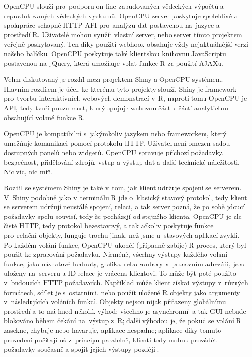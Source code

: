 \documentclass[thesis=B,czech]{FITthesis}[2012/06/26]
\begin{document}
OpenCPU slouží pro~podporu on-line zabudovaných vědeckých výpočtů a reprodukovaných vědeckých výzkumů. OpenCPU server poskytuje spolehlivé a spolupráce schopné HTTP API pro~analýzu dat postavenou na~jazyce a prostředí R. Uživatelé mohou využít vlastní server, nebo server tímto projektem veřejně poskytovaný. Ten díky použití webhook obsahuje vždy nejaktuálnější verzi našeho balíčku. OpenCPU poskytuje také klientskou knihovnu JavaScriptu postavenou na~jQuery, která umožňuje volat funkce R za použití AJAXu.

Velmi diskutovaný je rozdíl mezi projektem Shiny a OpenCPU systémem. Hlavním rozdílem je účel, ke kterému tyto projekty slouží. Shiny je framework pro~tvorbu interaktivních webových demonstrací v~R, naproti tomu OpenCPU je API, tedy tvoří pouze most, který spojuje webovou část s~částí analytickou obsahující volané funkce R. 

OpenCPU je kompatibilní s~jakýmkoliv jazykem nebo frameworkem, který umožňuje komunikaci pomocí protokolu HTTP. Uživatel není omezen sadou dostupných panelů nebo widgetů. OpenCPU spravuje příchozí požadavky, bezpečnost, přidělování zdrojů, vstup a výstup dat a další technické náležitosti. Nic víc, nic míň. 

Rozdíl se systémem Shiny je také v~tom, jak klient udržuje spojení se serverem. V~Shiny podobně jako v~terminálu R jde o~klasický stavový protokol, tedy klient se serverem udržují neustálé spojení, relaci, a tak server pozná, že po sobě jdoucí požadavky spolu souvisí, tedy že pocházejí od stejného klienta. OpenCPU je ale čisté HTTP, tedy protokol bezestavový, a tak ačkoliv poskytuje funkce pro~relační objekty, funguje trochu jinak, než jsme u~stavových aplikací zvyklí. Po každém volání funkce, OpenCPU ukončí (případně zabije) R proces, který byl použit ke zpracování požadavku. Nicméně, všechny výstupy každého volání funkce, jako návratové hodnoty, grafika nebo soubory v~pracovním adresáři, jsou uloženy na~serveru a ID relace je vrácena klientovi. To může být poté použito v~budoucích HTTP požadavcích. Například může klient získat výstupy v~různých formátech, sdílet je s~ostatními, nebo použít uložené R objekty jako argumenty v~následujících voláních funkcí. Objekty nejsou nijak přiřazeny globálnímu prostředí a to má hned několik výhod: všechno je asynchronní, a tak GUI nebude blokováno během čekání na~výstup z~R; další výhodou je, že pokud se volání R zasekne, chybuje nebo havaruje, aplikace nespadne; aplikace díky tomuto provedení počítají už z~principu paralelně, klienti tedy mohou provádět požadavky současně a spojit jejich výstupy později \cite{OpenCPUjsLibrary}. 
\end{document}
